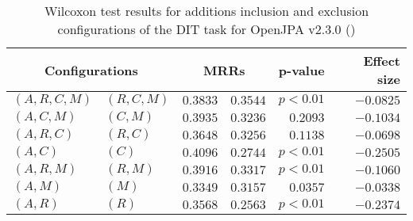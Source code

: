 
\begin{table}
\begin{spacing}{1.2}
\centering
\caption{Wilcoxon test results for additions inclusion and exclusion configurations of the DIT task for OpenJPA v2.3.0 (\ctwo)}
\label{table:versus-wilcox-openjpa-dit-additions}
\begin{tabular}{ll|rr|rr}
\toprule
      \multicolumn{2}{c|}{Configurations} &                \multicolumn{2}{c|}{MRRs} &        p-value & Effect size \\
\midrule
 $(A,R,C,M)$ &  $(R,C,M)$ &  $\bm{0.3833}$ &  $0.3544$ & $p<0.01$ &   $-0.0825$ \\
   $(A,C,M)$ &    $(C,M)$ &  $\bm{0.3935}$ &  $0.3236$ & $0.2093$ &   $-0.1034$ \\
   $(A,R,C)$ &    $(R,C)$ &  $\bm{0.3648}$ &  $0.3256$ & $0.1138$ &   $-0.0698$ \\
     $(A,C)$ &      $(C)$ &  $\bm{0.4096}$ &  $0.2744$ & $p<0.01$ &   $-0.2505$ \\
   $(A,R,M)$ &    $(R,M)$ &  $\bm{0.3916}$ &  $0.3317$ & $p<0.01$ &   $-0.1060$ \\
     $(A,M)$ &      $(M)$ &  $\bm{0.3349}$ &  $0.3157$ & $0.0357$ &   $-0.0338$ \\
     $(A,R)$ &      $(R)$ &  $\bm{0.3568}$ &  $0.2563$ & $p<0.01$ &   $-0.2374$ \\
\bottomrule
\end{tabular}

\end{spacing}
\end{table}

